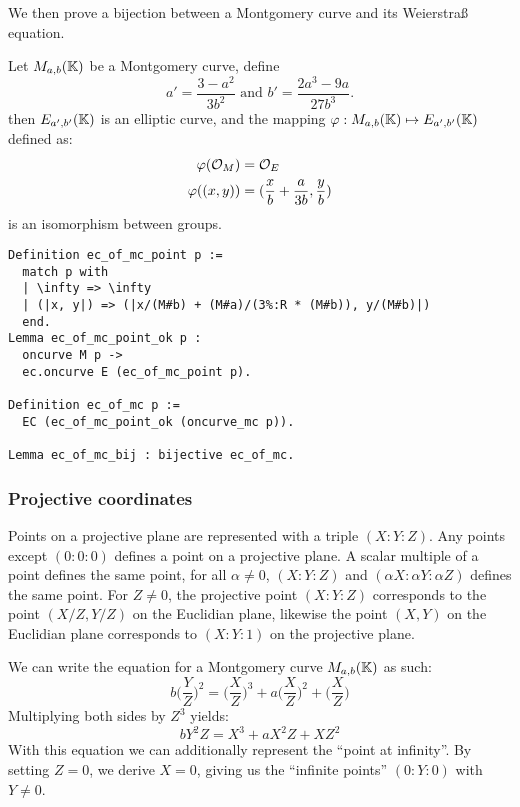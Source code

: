 We then prove a bijection between a Montgomery curve and its Weierstra{\ss} equation.
\begin{lemma}
  Let $M_{a,b}(\mathbb{K})$ be a Montgomery curve, define $$a' = \frac{3-a^2}{3b^2} \text{\ \ \ \ and\ \ \ \ } b' = \frac{2a^3 - 9a}{27b^3}.$$
  then $E_{a',b'}(\mathbb{K})$ is an elliptic curve, and the mapping $\varphi : M_{a,b}(\mathbb{K}) \mapsto E_{a',b'}(\mathbb{K})$ defined as:
  \begin{align*}
    \varphi(\mathcal{O}_M) &= \mathcal{O}_E\\
    \varphi( (x , y) ) &= ( \frac{x}{b} + \frac{a}{3b} , \frac{y}{b} )
  \end{align*}
  is an isomorphism between groups.
\end{lemma}
\begin{lstlisting}[language=Coq]
Definition ec_of_mc_point p :=
  match p with
  | \infty => \infty
  | (|x, y|) => (|x/(M#b) + (M#a)/(3%:R * (M#b)), y/(M#b)|)
  end.
Lemma ec_of_mc_point_ok p :
  oncurve M p ->
  ec.oncurve E (ec_of_mc_point p).

Definition ec_of_mc p :=
  EC (ec_of_mc_point_ok (oncurve_mc p)).

Lemma ec_of_mc_bij : bijective ec_of_mc.
\end{lstlisting}

\subsubsection{Projective coordinates}
\label{projective}
Points on a projective plane are represented with a triple $(X:Y:Z)$. Any points except $(0:0:0)$ defines a point on a projective plane. A scalar multiple of a point defines the same point, \ie
for all $\alpha \neq 0$, $(X:Y:Z)$ and $(\alpha X:\alpha Y:\alpha Z)$ defines the same point. For $Z\neq 0$, the projective point $(X:Y:Z)$ corresponds to the point $(X/Z,Y/Z)$ on the Euclidian plane, likewise the point $(X,Y)$ on the Euclidian plane corresponds to $(X:Y:1)$ on the projective plane.

We can write the equation for a Montgomery curve $M_{a,b}(\mathbb{K})$ as such:
\begin{equation}
b \bigg(\frac{Y}{Z}\bigg)^2 = \bigg(\frac{X}{Z}\bigg)^3 + a \bigg(\frac{X}{Z}\bigg)^2 + \bigg(\frac{X}{Z}\bigg)
\end{equation}
Multiplying both sides by $Z^3$ yields:
\begin{equation}
b Y^2Z = X^3 + a X^2Z + XZ^2
\end{equation}
With this equation we can additionally represent the ``point at infinity''. By setting $Z=0$, we derive $X=0$, giving us the ``infinite points'' $(0:Y:0)$ with $Y\neq 0$.

